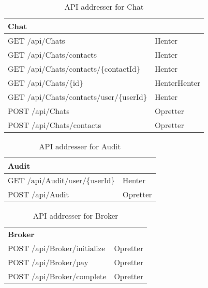 \begin{table}[H]
	\centering
	\caption{API addresser for Chat}
	\label{tab:web_user}
	\begin{tabular}{p{5cm}|p{11cm}}
		\hline
		\multicolumn{2}{l}{\textbf{Chat}}\\
		\hline
		GET \newline
		/api/Chats &
		 Henter \\
		\hline
		GET \newline
		/api/Chats/contacts &
		Henter \\
		\hline
		GET \newline
		/api/Chats/contacts/\{contactId\} &
		Henter \\
		\hline
		GET \newline
		/api/Chats/\{id\} &
		HenterHenter \\
		\hline
		GET \newline
		/api/Chats/contacts/user/\{userId\} &
		Henter \\
		\hline
		POST \newline
		/api/Chats &
		Opretter  \\
		\hline
		POST \newline
		/api/Chats/contacts &
		Opretter \\
		\hline
	
	\end{tabular}
\end{table}


\begin{table}[H]
	\centering
	\caption{API addresser for Audit}
	\label{tab:web_user}
	\begin{tabular}{p{5cm}|p{11cm}}
		\hline
		\multicolumn{2}{l}{\textbf{Audit}}\\
		\hline
		GET \newline
		/api/Audit/user/\{userId\} & Henter  \\
		\hline
		POST \newline
		/api/Audit &
		Opretter \\
		\hline
	
	\end{tabular}
\end{table}

\begin{table}[H]
	\centering
	\caption{API addresser for Broker}
	\label{tab:web_user}
	\begin{tabular}{p{5cm}|p{11cm}}
		\hline
		\multicolumn{2}{l}{\textbf{Broker}}\\
		POST \newline
		/api/Broker/initialize &
		Opretter  \\
		\hline
		POST \newline
		/api/Broker/pay &
		Opretter  \\
		\hline
		POST \newline
		/api/Broker/complete &
		Opretter \\
		\hline
	
	\end{tabular}
\end{table}
